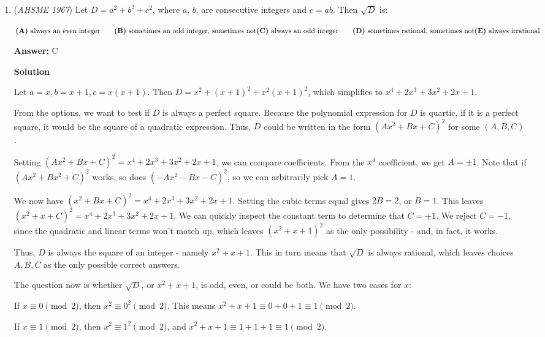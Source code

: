 \begin{enumerate}
	\item (\textit{AHSME 1967}) Let $D=a^2+b^2+c^2$, where $a$, $b$, are consecutive integers and $c=ab$.  Then $\sqrt{D}$ is:


 $\textbf{(A)}\ \text{always an even integer}\qquad \textbf{(B)}\ \text{sometimes an odd integer, sometimes not}\\ \textbf{(C)}\ \text{always an odd integer}\qquad \textbf{(D)}\ \text{sometimes rational, sometimes not}\\ \textbf{(E)}\ \text{always irrational}$

 \textbf{Answer: }C



\textbf{Solution}

Let $a=x, b=x+1, c = x(x+1)$.  Then $D = x^2 + (x+1)^2 + x^2(x+1)^2$, which simplifies to $x^4 + 2x^3 + 3x^2 + 2x + 1$.

 From the options, we want to test if $D$ is always a perfect square.  Because the polynomial expression for $D$ is quartic, if it is a perfect square, it would be the square of a quadratic expression.  Thus, $D$ could be written in the form $(Ax^2 + Bx + C)^2$ for some $(A, B, C)$.

 Setting $(Ax^2 + Bx + C)^2 = x^4 + 2x^3 + 3x^2 + 2x + 1$, we can compare coefficients.  From the $x^4$ coefficient, we get $A = \pm 1$.  Note that if $(Ax^2 + Bx^2 + C)^2$ works, so does $(-Ax^2 - Bx - C)^2$, so we can arbitrarily pick $A=1$.

 We now have $(x^2 + Bx + C)^2= x^4 + 2x^3 + 3x^2 + 2x + 1$.  Setting the cubic terms equal gives $2B = 2$, or $B = 1$.  This leaves $(x^2 + x + C)^2 =  x^4 + 2x^3 + 3x^2 + 2x + 1$.  We can quickly inspect the constant term to determine that $C = \pm 1$.  We reject $C = -1$, since the quadratic and linear terms won't match up, which leaves $(x^2 + x + 1)^2$ as the only possibility - and, in fact, it works.

 Thus, $D$ is always the square of an integer - namely $x^2 + x + 1$. This in turn means that $\sqrt{D}$ is always rational, which leaves choices $A, B, C$ as the only possible correct answers.

 The question now is whether $\sqrt{D}$, or $x^2 + x + 1$, is odd, even, or could be both.  We have two cases for $x$:

 If $x \equiv 0 \pmod 2$, then $x^2 \equiv 0^2 \pmod 2$.  This means $x^2 + x + 1 \equiv 0 + 0 + 1 \equiv 1 \pmod 2$.  

 If $x \equiv 1 \pmod 2$, then $x^2 \equiv 1^2 \pmod 2$, and $x^2 + x + 1 \equiv 1 + 1 + 1 \equiv 1 \pmod 2$.  


\end{enumerate}
